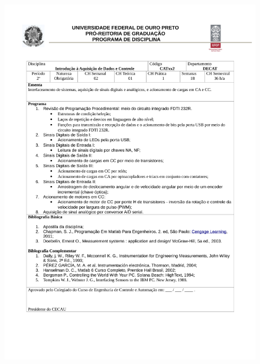 \begin{figure}[p]
	\centering 
	\includegraphics[scale=0.7]{capitulos/anexo1-programas-disciplina/p22.pdf}
\end{figure}

